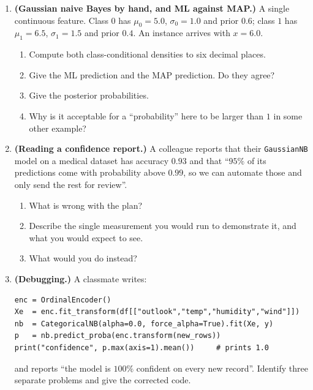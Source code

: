 \documentclass[11pt]{article}
\begin{document}
\begin{enumerate}[leftmargin=*, itemsep=0.55em]
\item \textbf{(Gaussian naive Bayes by hand, and ML against MAP.)} A single
  continuous feature. Class $0$ has $\mu_0 = 5.0$, $\sigma_0 = 1.0$ and prior
  $0.6$; class $1$ has $\mu_1 = 6.5$, $\sigma_1 = 1.5$ and prior $0.4$. An
  instance arrives with $x = 6.0$.
  \begin{enumerate}[label=(\alph*)]
    \item Compute both class-conditional densities to six decimal places.
    \item Give the ML prediction and the MAP prediction. Do they agree?
    \item Give the posterior probabilities.
    \item Why is it acceptable for a ``probability'' here to be larger than
      $1$ in some other example?
  \end{enumerate}

\item \textbf{(Reading a confidence report.)} A colleague reports that their
  \texttt{GaussianNB} model on a medical dataset has accuracy $0.93$ and that
  ``$95\%$ of its predictions come with probability above $0.99$, so we can
  automate those and only send the rest for review''.
  \begin{enumerate}[label=(\alph*)]
    \item What is wrong with the plan?
    \item Describe the single measurement you would run to demonstrate it,
      and what you would expect to see.
    \item What would you do instead?
  \end{enumerate}

\item \textbf{(Debugging.)} A classmate writes:

\begin{lstlisting}
enc = OrdinalEncoder()
Xe  = enc.fit_transform(df[["outlook","temp","humidity","wind"]])
nb  = CategoricalNB(alpha=0.0, force_alpha=True).fit(Xe, y)
p   = nb.predict_proba(enc.transform(new_rows))
print("confidence", p.max(axis=1).mean())     # prints 1.0
\end{lstlisting}

  and reports ``the model is $100\%$ confident on every new record''.
  Identify three separate problems and give the corrected code.


\end{enumerate}
\end{document}
